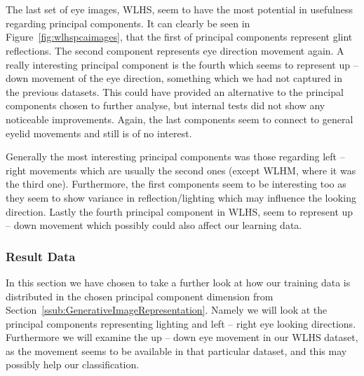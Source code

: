 \begin{minipage}{\linewidth}
{\begin{tabular}{ccccccc}
  \end{tabular}
  }
  \label{fig:wlhspcaimages}
  \end{minipage}\\\\

  The last set of eye images, WLHS, seem to have the most potential in usefulness regarding principal components. It can clearly be seen in Figure~\ref{fig:wlhspcaimages},
  that the first of principal components represent glint reflections. The second component represents eye direction movement again. A really interesting principal component
  is the fourth which seems to represent up -- down movement of the eye direction, something which we had not captured in the previous datasets. This could
  have provided an alternative to the principal components chosen to further analyse, but internal tests did not show any noticeable improvements.
  Again, the last components seem to connect to general eyelid movements and still is of no interest.

  Generally the most interesting principal components was those regarding left -- right movements which are usually the second ones (except WLHM, where it was the third one).
  Furthermore, the first components seem to be interesting too as they seem to show variance in reflection/lighting which may influence the looking direction.
  Lastly the fourth principal component in WLHS, seem to represent up -- down movement which possibly could also affect our learning data.

\subsubsection{Result Data}
\label{ssub:ResultData}
In this section we have chosen to take a further look at how our training data is distributed in the chosen principal component dimension from Section~\ref{ssub:GenerativeImageRepresentation}.
Namely we will look at the principal components representing lighting and left -- right eye looking directions. Furthermore we will examine the up -- down
eye movement in our WLHS dataset, as the movement seems to be available in that particular dataset, and this may possibly help our classification.\\

\begin{minipage}{\linewidth}
  \centering
  \label{fig:pca12plotnlhm}
\end{minipage}\\\\

